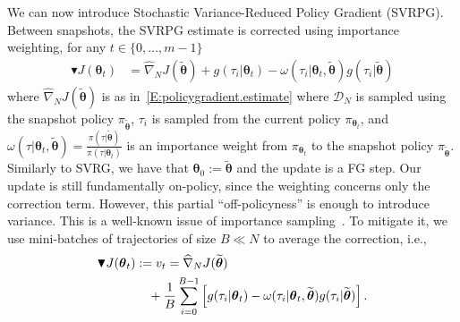 \documentclass{article}
\makeatletter
\theoremstyle{remark}
\theoremstyle{definition}
\DeclareRobustCommand{\eg}{e.g.,\@\xspace}
\DeclareRobustCommand{\ie}{i.e.,\@\xspace}
\newcommand{\vtheta}{\boldsymbol{\theta}}
\newcommand{\Reward}{\mathcal{R}}
\newcommand{\wt}[1]{\widetilde{#1}}
\newcommand{\wh}[1]{\widehat{#1}}
\makeatother
\begin{document}
We can now introduce Stochastic Variance-Reduced Policy Gradient (SVRPG).
Between snapshots, the SVRPG estimate is corrected using importance weighting, for any $t \in \{0,\ldots,m-1\}$
\begin{align*}
        \blacktriangledown J(\vtheta_{t}) &= \wh{\nabla}_N J(\wt{\vtheta}) + g(\tau_i|\vtheta_t) - \omega(\tau_i|\vtheta_t, \wt{\vtheta}) g(\tau_i|\wt{\vtheta})
\end{align*}
where $\wh{\nabla}_N J(\wt{\vtheta})$ is as in~\eqref{E:policygradient.estimate} where $\mathcal{D}_N$ is sampled using the snapshot policy $\pi_{\wt{\vtheta}}$, $\tau_i$ is sampled from the current policy $\pi_{\vtheta_t}$, and $\omega(\tau|\vtheta_t, \wt{\vtheta}) = \frac{\pi(\tau|\wt{\vtheta})}{\pi(\tau|\vtheta_t)}$ is an importance weight from $\pi_{\vtheta_t}$ to the snapshot policy $\pi_{\wt{\vtheta}}$. 
Similarly to SVRG, we have that $\vtheta_0 := \wt{\vtheta}$ and the update is a FG step.
Our update is still fundamentally on-policy, since the weighting concerns only the correction term. However, this partial ``off-policyness'' is enough to introduce variance. This is a well-known issue of importance sampling~\citep[\eg][]{thomas2015high}. To mitigate it, we use mini-batches of trajectories of size $B \ll N$ to average the correction, \ie
\begin{align}\label{E:svrpg.estimate.batch}
        \blacktriangledown J(\vtheta_{t}) &:= v_t= \wh{\nabla}_N J(\wt{\vtheta})\\ \notag
                                            & \quad{} + \frac{1}{B} \sum_{i=0}^{B-1} \left[
        g(\tau_i|\vtheta_t) - \omega(\tau_i|\vtheta_t, \wt{\vtheta}) g(\tau_i|\wt{\vtheta})
        \right].
\end{align}
\end{document}
